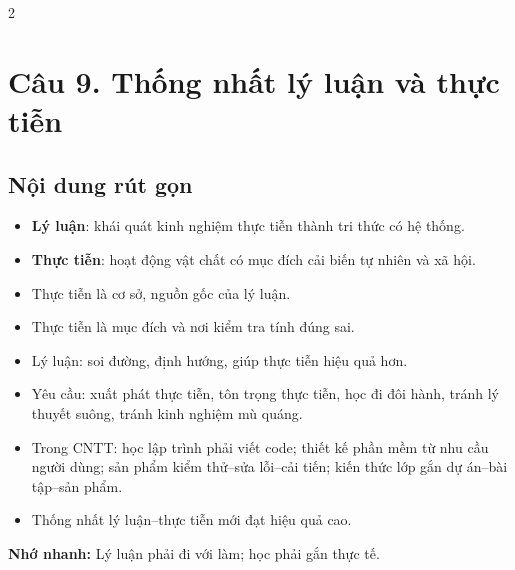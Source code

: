 \documentclass[9pt,a4paper]{extarticle}
\begin{document}
\begin{multicols*}{2}
\section*{Câu 9. Thống nhất lý luận và thực tiễn}
\subsection*{Nội dung rút gọn}
\begin{itemize}
  \item \textbf{Lý luận}: khái quát kinh nghiệm thực tiễn thành tri thức có hệ thống.
  \item \textbf{Thực tiễn}: hoạt động vật chất có mục đích cải biến tự nhiên và xã hội.
  \item Thực tiễn là cơ sở, nguồn gốc của lý luận.
  \item Thực tiễn là mục đích và nơi kiểm tra tính đúng sai.
  \item Lý luận: soi đường, định hướng, giúp thực tiễn hiệu quả hơn.
  \item Yêu cầu: xuất phát thực tiễn, tôn trọng thực tiễn, học đi đôi hành, tránh lý thuyết suông, tránh kinh nghiệm mù quáng.
  \item Trong CNTT: học lập trình phải viết code; thiết kế phần mềm từ nhu cầu người dùng; sản phẩm kiểm thử--sửa lỗi--cải tiến; kiến thức lớp gắn dự án--bài tập--sản phẩm.
  \item Thống nhất lý luận--thực tiễn mới đạt hiệu quả cao.
\end{itemize}
\textbf{Nhớ nhanh:} Lý luận phải đi với làm; học phải gắn thực tế.

\end{multicols*}
\end{document}
